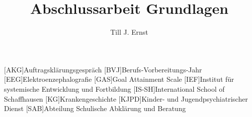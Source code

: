 


\title{Abschlussarbeit Grundlagen}
\author{Till J. Ernst}






\tableofcontents
\newpage

\begin{acronym}[KJPD]
[AKG]{Auftragsklärungsgespräch}
[BVJ]{Berufs-Vorbereitungs-Jahr}
[EEG]{Elektroenzephalografie}
[GAS]{Goal Attainment Scale}
[IEF]{Institut für systemische Entwicklung und Fortbildung}
[IS-SH]{International School of Schaffhausen}
[KG]{Krankengeschichte}
[KJPD]{Kinder- und Jugendpsychiatrischer Dienst}
[SAB]{Abteilung Schulische Abklärung und Beratung}
\end{acronym}
\newpage

%











\newpage
\begin{flushleft}
{}
\end{flushleft}

\renewcommand{\appendixtocname}{Anhang}
\renewcommand{\appendixname}{Anhang}
\renewcommand{\appendixpagename}{Anhang}

\newpage



%
%
%